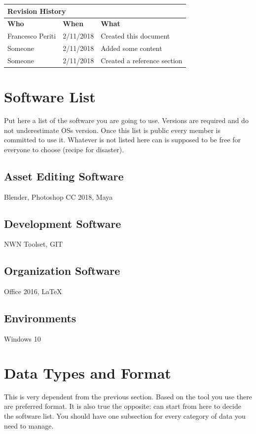 \documentclass[12pt]{article}
\begin{document}
\begin{center}
\begin{table}[]
\begin{tabular}{lll}
\hline
\multicolumn{3}{|l|}{\cellcolor{gray}\textbf{Revision History}}\\ \hline
\multicolumn{1}{|l|}{\cellcolor{gray}\textbf{Who}} & \multicolumn{1}{l|}{\cellcolor{gray}\textbf{When}} & \multicolumn{1}{l|}{\cellcolor{gray}\textbf{What}}\\ \hline
\multicolumn{1}{|l|}{Francesco Periti} & \multicolumn{1}{l|}{2/11/2018} & \multicolumn{1}{l|}{Created this document}\\ \hline
\multicolumn{1}{|l|}{Someone} & \multicolumn{1}{l|}{2/11/2018} & \multicolumn{1}{l|}{Added some content}\\ \hline
\multicolumn{1}{|l|}{Someone} & \multicolumn{1}{l|}{2/11/2018} & \multicolumn{1}{l|}{Created a reference section}\\ \hline
\end{tabular}
\end{table}

\end{center}

\section{Software List}
Put here a list of the software you are going to use. Versions are required and do not underestimate OSs version.
Once this list is public every member is committed to use it.
Whatever is not listed here can is supposed to be free for everyone to choose (recipe for disaster).
\subsection{Asset Editing Software}
Blender, Photoshop CC 2018, Maya
\subsection{Development Software}
NWN Toolset, GIT
\subsection{Organization Software}
Office 2016, LaTeX
\subsection{Environments}
Windows 10
\section{Data Types and Format}
This is very dependent from the previous section. Based on the tool you use there are preferred format. It is also true the opposite: can start from here to decide the software list.
You should have one subsection for every category of data you need to manage. 
\end{document}
